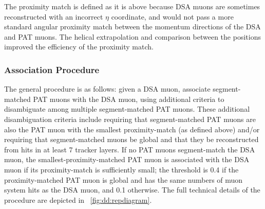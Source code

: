 The proximity match is defined as it is above because DSA muons are sometimes reconstructed with an incorrect $\eta$ coordinate, and would not pass a more standard angular proximity match between the momentum directions of the DSA and PAT muons.
The helical extrapolation and comparison between the positions improved the efficiency of the proximity match.

\subsubsection{\DSAToPAT Association Procedure}
The general procedure is as follows: given a DSA muon, associate segment-matched PAT muons with the DSA muon, using additional criteria to disambiguate among multiple segment-matched PAT muons.
These additional disambiguation criteria include requiring that segment-matched PAT muons are also the PAT muon with the smallest proximity-match \deltaR (as defined above) and/or requiring that segment-matched muons be global and that they be reconstructed from hits in at least 7 tracker layers.
If no PAT muons segment-match the DSA muon, the smallest-\deltaR proximity-matched PAT muon is associated with the DSA muon if its proximity-match \deltaR is sufficiently small; the threshold is 0.4 if the proximity-matched PAT muon is global and has the same numbers of muon system hits as the DSA muon, and 0.1 otherwise.
The full technical details of the procedure are depicted in \Fig~\ref{fig:dd:repdiagram}.

